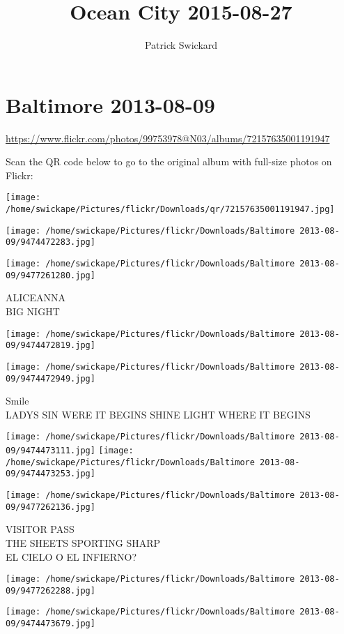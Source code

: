 \documentclass[10pt,letterpaper]{article}
\title{Ocean City 2015-08-27}
\author{Patrick Swickard}
\date{}
\begin{document}
\section*{Baltimore 2013-08-09}

\url{https://www.flickr.com/photos/99753978@N03/albums/72157635001191947}

Scan the QR code below to go to the original album with full-size photos on Flickr:

\texttt{[image: /home/swickape/Pictures/flickr/Downloads/qr/72157635001191947.jpg]}
\pagebreak

\texttt{[image: /home/swickape/Pictures/flickr/Downloads/Baltimore 2013-08-09/9474472283.jpg]}

\vspace{0.25in}
\texttt{[image: /home/swickape/Pictures/flickr/Downloads/Baltimore 2013-08-09/9477261280.jpg]}

ALICEANNA\\
BIG NIGHT
\pagebreak

\texttt{[image: /home/swickape/Pictures/flickr/Downloads/Baltimore 2013-08-09/9474472819.jpg]}

\vspace{0.25in}
\texttt{[image: /home/swickape/Pictures/flickr/Downloads/Baltimore 2013-08-09/9474472949.jpg]}

Smile\\
LADYS SIN WERE IT BEGINS SHINE LIGHT WHERE IT BEGINS
\pagebreak

\texttt{[image: /home/swickape/Pictures/flickr/Downloads/Baltimore 2013-08-09/9474473111.jpg]}
\texttt{[image: /home/swickape/Pictures/flickr/Downloads/Baltimore 2013-08-09/9474473253.jpg]}

\texttt{[image: /home/swickape/Pictures/flickr/Downloads/Baltimore 2013-08-09/9477262136.jpg]}

VISITOR PASS\\
THE SHEETS SPORTING SHARP\\
EL CIELO O EL INFIERNO?
\pagebreak

\texttt{[image: /home/swickape/Pictures/flickr/Downloads/Baltimore 2013-08-09/9477262288.jpg]}

\vspace{0.25in}
\texttt{[image: /home/swickape/Pictures/flickr/Downloads/Baltimore 2013-08-09/9474473679.jpg]}
\end{document}
